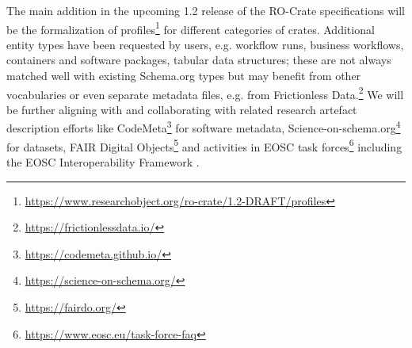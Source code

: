 \documentclass[ds,v1.1.2,openaccess]{iosart2x}%
\begin{document}
The main addition in the upcoming 1.2 release of the RO-Crate
specifications will be the formalization of
profiles\footnote{\url{https://www.researchobject.org/ro-crate/1.2-DRAFT/profiles}}
for different categories of crates. Additional entity types have been
requested by users, e.g. workflow runs, business workflows, containers
and software packages, tabular data structures; these are not always
matched well with existing Schema.org types but may benefit from other
vocabularies or even separate metadata files, e.g. from Frictionless
Data.\footnote{\url{https://frictionlessdata.io/}} We will be further aligning with
and collaborating with related research artefact description efforts
like CodeMeta\footnote{\url{https://codemeta.github.io/}} for software metadata,
Science-on-schema.org\footnote{\url{https://science-on-schema.org/}}
\cite{doi:10.5281/zenodo.4477164} for datasets, FAIR Digital
Objects\footnote{\url{https://fairdo.org/}} \cite{doi:10.3390/publications8020021} and
activities in EOSC task forces\footnote{\url{https://www.eosc.eu/task-force-faq}}
including the EOSC Interoperability Framework \cite{doi:10.2777/620649}.





%

\end{document}
